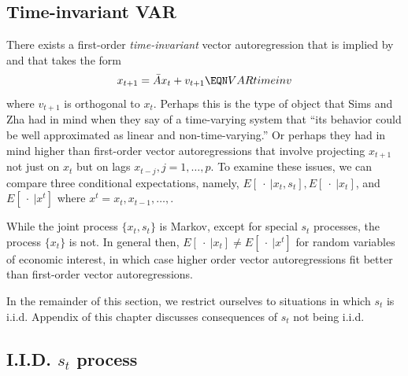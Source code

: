 \subsection{Time-invariant VAR}
 There exists a  first-order
  {\it time-invariant\/} vector autoregression that is implied by    and that takes the form
  $$ x_{t+1} = \bar A x_t + v_{t+1} \EQN VARtimeinv$$
  where $v_{t+1}$ is orthogonal to $x_t$. 
  Perhaps this is the type of  object that Sims and Zha had  in mind
  when they say of a time-varying system that ``its behavior could be well approximated as linear and non-time-varying.'' Or perhaps they had in mind higher than first-order vector autoregressions 
  that involve projecting $x_{t+1}$ not just on $x_t$ but on lags $x_{t-j}, j= 1, \ldots, p$.
To examine these issues, we can compare three  conditional expectations, namely,
$ E [ \ \cdot \  | x_t, s_t], E [ \ \cdot \ | x_t ]$, and $E [ \ \cdot \ | x^t ]$
where $x^t = x_t, x_{t-1}, \ldots, $. 

While the joint process $\{x_t, s_t\}$ is Markov, except for special $s_t$ processes,  the process $\{ x_t \}$ is not. In general then,  $ E [ \ \cdot \ | x_t ] \neq E [ \ \cdot \ | x^t ]$
for random variables of economic interest, in which case higher order vector autoregressions fit better than 
first-order vector autoregressions.

In the remainder of this section, we restrict ourselves to situations in which $s_t$ is i.i.d.  Appendix   of this chapter discusses  consequences of $s_t$ not being i.i.d.



\subsection{I.I.D. $s_t$ process}

